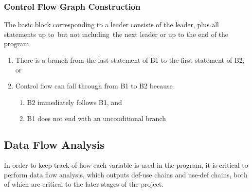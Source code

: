 \subsubsection{Control Flow Graph Construction}
The basic block corresponding to a leader consists of the leader, plus all statements up to but not including the next leader or up to the end of the program
\begin{enumerate}
\item There is a branch from the last statement of B1 to the first statement of B2, or
\item Control flow can fall through from B1 to B2 because
\begin{enumerate}
\item B2 immediately follows B1, and
\item B1 does not end with an unconditional branch
\end{enumerate}
\end{enumerate}

\subsection{Data Flow Analysis}
In order to keep track of how each variable is used in the program, it is critical to perform data flow analysis, which outputs def-use chains and use-def chains, both of which are critical to the later stages of the project.
